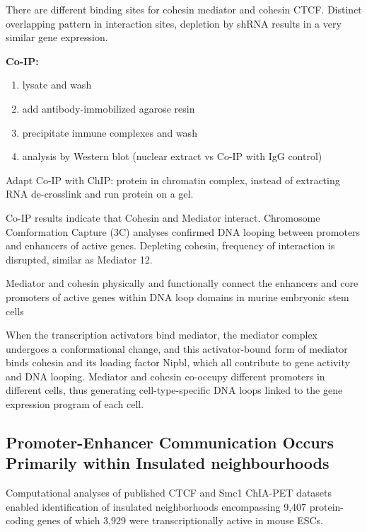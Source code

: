 There are different binding sites for cohesin mediator and cohesin CTCF. Distinct overlapping pattern in interaction sites, depletion by shRNA results in a very similar gene expression.

\textbf{Co-IP:}

\begin{enumerate}
\def\labelenumi{\arabic{enumi}.}
\tightlist
\item
  lysate and wash
\item
  add antibody-immobilized agarose resin
\item
  precipitate immune complexes and wash
\item
  analysis by Western blot (nuclear extract vs Co-IP with IgG control)
\end{enumerate}

Adapt Co-IP with ChIP: protein in chromatin complex, instead of extracting RNA de-crosslink and run protein on a gel.

Co-IP results indicate that Cohesin and Mediator interact. Chromosome Comformation Capture (3C) analyses confirmed DNA looping between promoters and enhancers of active genes. Depleting cohesin, frequency of interaction is disrupted, similar as Mediator 12.

Mediator and cohesin physically and functionally connect the enhancers and core
promoters of active genes within DNA loop domains in murine embryonic stem cells

When the transcription activators bind mediator, the mediator complex undergoes a conformational change, and this activator-bound form of mediator binds cohesin and its loading factor Nipbl, which all contribute to gene activity and DNA looping. Mediator and cohesin co-occupy different promoters in different cells, thus generating cell-type-specific DNA loops linked to the gene expression program of each cell.

\hypertarget{promoter-enhancer-communication-occurs-primarily-within-insulated-neighbourhoods}{%
\subsection{Promoter-Enhancer Communication Occurs Primarily within Insulated neighbourhoods}\label{promoter-enhancer-communication-occurs-primarily-within-insulated-neighbourhoods}}

Computational analyses of published CTCF and Smc1 ChIA-PET datasets enabled identification of insulated neighborhoods encompassing 9,407 protein-coding genes of which 3,929 were transcriptionally active in mouse ESCs.


